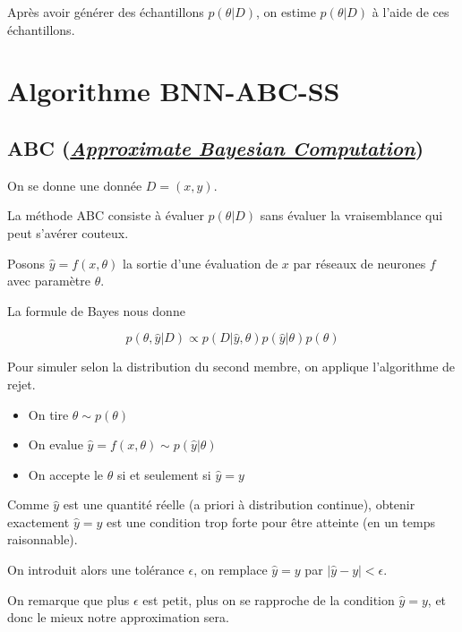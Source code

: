 \documentclass[french,12pt]{article}
\let\oldsection\section%
\renewcommand{\section}{%
  \renewcommand{\theequation}{\thesection.\arabic{equation}}%
  \oldsection}%
\let\oldsubsection\subsection%
\renewcommand{\subsection}{%
  \renewcommand{\theequation}{\thesubsection.\arabic{equation}}%
  \oldsubsection}%
\begin{document}
Après avoir générer des échantillons $p(\theta | D)$, on estime $p(\theta | D)$ à l'aide de ces 
échantillons.





\pagebreak

\section{Algorithme BNN-ABC-SS}

\subsection{ABC (\href{https://en.wikipedia.org/wiki/Approximate_Bayesian_computation}{\textit{Approximate Bayesian Computation}})}

On se donne une donnée $D = (x, y)$.

La méthode ABC consiste à évaluer $p(\theta | D)$ sans évaluer
la vraisemblance qui peut s'avérer couteux.

Posons $\hat{y} = f(x, \theta)$ la sortie d'une évaluation de $x$ par
réseaux de neurones $f$ avec paramètre $\theta$.

La formule de Bayes nous donne

\begin{equation}
    p(\theta, \hat{y} | D) \propto p(D | \hat{y}, \theta) p(\hat{y} | \theta)
    p(\theta) 
\end{equation}

Pour simuler selon la distribution du second membre, on applique
l'algorithme de rejet.

\begin{itemize}
    \item On tire $\theta \sim p(\theta)$
    \item On evalue $\hat{y} = f(x , \theta) \sim p(\hat{y} | \theta)$
    \item On accepte le $\theta$ si et seulement si $\hat{y} = y$
\end{itemize}

Comme $\hat{y}$ est une quantité réelle (a priori à distribution continue),
obtenir exactement $\hat{y} = y$ est une condition trop forte
pour être atteinte (en un temps raisonnable).

On introduit alors une tolérance $\epsilon$, on remplace $\hat{y} = y$
par $|\hat{y} - y| < \epsilon$.

On remarque que plus $\epsilon$ est petit, plus on se rapproche de la condition $\hat{y} = y$,
et donc le mieux notre approximation sera.
\end{document}
